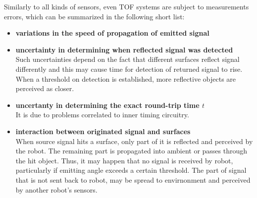 \documentclass[a4paper, onecolumn]{report}
\begin{document}
Similarly to all kinds of sensors, even TOF systems are subject to measurements errors, which can be summarized in the following short list:
\begin{itemize}
\item{\bf{variations in the speed of propagation of emitted signal}}
\item{\textbf{uncertainty in determining when reflected signal was detected}\\ 
Such uncertainties depend on the fact that different surfaces reflect signal differently and this may cause time for detection of returned signal to rise. When a threshold on detection is established, more reflective objects are perceived as closer.}
\item{\textbf{uncertanty in determining the exact round-trip time $t$}\\
 It is due to problems correlated to inner timing circuitry.}
\item{\textbf{interaction between originated signal and surfaces} \\
When source signal hits a surface, only part of it is reflected and perceived by the robot. The remaining part is propagated into ambient or passes through the hit object. Thus, it may happen that no signal is received by robot, particularly if emitting angle exceeds a certain threshold. The part of signal that is not sent back to robot, may be spread to envirnonment and perceived by another robot's sensors.}
\end{itemize}
\end{document}
